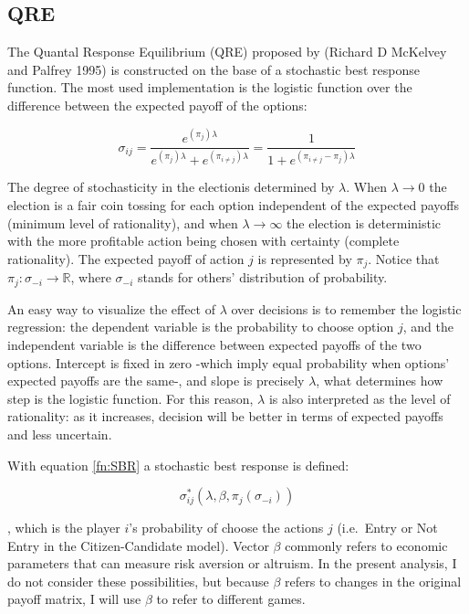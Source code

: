 \subsection{QRE}\label{qre}

The Quantal Response Equilibrium (QRE) proposed by (Richard D McKelvey
and Palfrey 1995) is constructed on the base of a stochastic best
response function. The most used implementation is the logistic function
over the difference between the expected payoff of the options:

\begin{equation}\label{fn:SBR}
\sigma_{ij}= \displaystyle\frac{e^{(\pi_{j})\lambda}}{e^{(\pi_{j})\lambda}+e^{(\pi_{i\ne j})\lambda} } 
=\displaystyle\frac{1}{1+e^{(\pi_{i\ne j}-\pi_{j})\lambda }}        
\end{equation}

The degree of stochasticity in the electionis determined by \(\lambda\). When
\(\lambda \rightarrow 0\) the election is a fair coin tossing for each
option independent of the expected payoffs (minimum level of
rationality), and when \(\lambda \rightarrow \infty\) the election is
deterministic with the more profitable action being chosen with
certainty (complete rationality). The expected payoff of action \(j\) is
represented by \(\pi_j\). Notice that $\pi_j: \sigma_{-i} \rightarrow \mathbb{R}$, where $\sigma_{-i}$ stands for others' distribution of probability.

An easy way to visualize the effect of \(\lambda\) over decisions is to
remember the logistic regression: the dependent variable is the
probability to choose option \(j\), and the independent variable is the
difference between expected payoffs of the two options. Intercept is
fixed in zero -which imply equal probability when options' expected
payoffs are the same-, and slope is precisely \(\lambda\), what
determines how step is the logistic function. For this reason,
\(\lambda\) is also interpreted as the level of rationality: as it
increases, decision will be better in terms of expected payoffs and less
uncertain.


With equation \ref{fn:SBR} a stochastic best response is defined:

\begin{equation}
\sigma^*_{ij}(\lambda, \beta, \pi_{j}(\sigma_{-i}))
\end{equation}\label{eq:SBR} 

, which is the player \(i\)'s probability of choose the
actions \(j\) (i.e.~Entry or Not Entry in the Citizen-Candidate model).
Vector \(\beta\) commonly refers to economic parameters that can measure
risk aversion or altruism. In the present analysis, I do not consider
these possibilities, but because \(\beta\) refers to changes in the
original payoff matrix, I will use \(\beta\) to refer to different
games.

